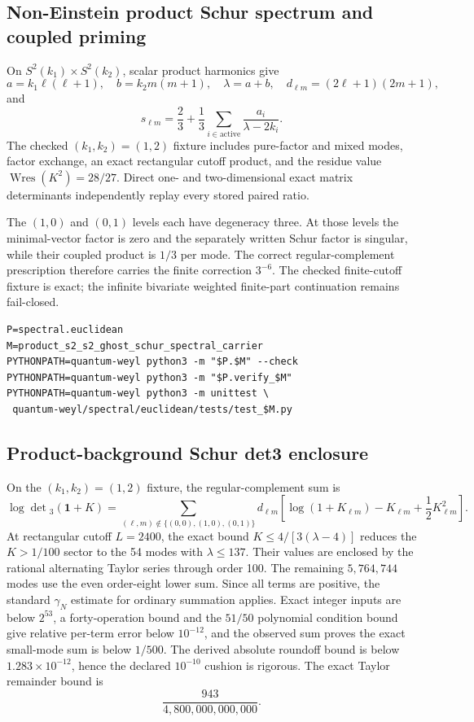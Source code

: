 \documentclass[11pt]{article}
\theoremstyle{definition}
\theoremstyle{remark}
\begin{document}
\subsection{Non-Einstein product Schur spectrum and coupled priming}

On $S^2(k_1)\times S^2(k_2)$, scalar product harmonics give
\[
 a=k_1\ell(\ell+1),\quad b=k_2m(m+1),\quad \lambda=a+b,
 \quad d_{\ell m}=(2\ell+1)(2m+1),
\]
and
\[
 s_{\ell m}=\frac23+\frac13\sum_{i\in\mathrm{active}}
 \frac{a_i}{\lambda-2k_i}.
\]
The checked $(k_1,k_2)=(1,2)$ fixture includes pure-factor and mixed modes,
factor exchange, an exact rectangular cutoff product, and the residue value
$\operatorname{Wres}(K^2)=28/27$.  Direct one- and two-dimensional exact
matrix determinants independently replay every stored paired ratio.

The $(1,0)$ and $(0,1)$ levels each have degeneracy three.  At those levels
the minimal-vector factor is zero and the separately written Schur factor is
singular, while their coupled product is $1/3$ per mode.  The correct
regular-complement prescription therefore carries the finite correction
$3^{-6}$.  The checked finite-cutoff fixture is exact; the infinite
bivariate weighted finite-part continuation remains fail-closed.

\begin{verbatim}
P=spectral.euclidean
M=product_s2_s2_ghost_schur_spectral_carrier
PYTHONPATH=quantum-weyl python3 -m "$P.$M" --check
PYTHONPATH=quantum-weyl python3 -m "$P.verify_$M"
PYTHONPATH=quantum-weyl python3 -m unittest \
 quantum-weyl/spectral/euclidean/tests/test_$M.py
\end{verbatim}

\subsection{Product-background Schur det3 enclosure}

On the $(k_1,k_2)=(1,2)$ fixture, the regular-complement sum is
\[
 \log\det{}_3(\mathbf1+K)=
 \sum_{(\ell,m)\notin\{(0,0),(1,0),(0,1)\}}d_{\ell m}
 \left[\log(1+K_{\ell m})-K_{\ell m}+\frac12K_{\ell m}^2\right].
\]
At rectangular cutoff $L=2400$, the exact bound
$K\leq4/[3(\lambda-4)]$ reduces the $K>1/100$ sector to the 54 modes with
$\lambda\leq137$.  Their values are enclosed by the rational alternating
Taylor series through order 100.  The remaining $5{,}764{,}744$ modes use the
even order-eight lower sum.  Since all terms are positive, the standard
$\gamma_N$ estimate for ordinary summation applies.  Exact integer inputs are
below $2^{53}$, a forty-operation bound and the $51/50$ polynomial condition
bound give relative per-term error below $10^{-12}$, and the observed sum
proves the exact small-mode sum is below $1/500$.  The derived absolute
roundoff bound is below $1.283\times10^{-12}$, hence the declared $10^{-10}$
cushion is rigorous.  The exact Taylor remainder bound is
\[
 \frac{943}{4{,}800{,}000{,}000{,}000}.
\]
\end{document}
